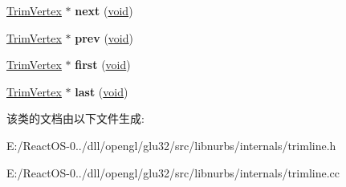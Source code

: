 \begin{DoxyCompactItemize}
\item 
\mbox{\label{class_trimline_aff8731faa5850ffe2c66caf4338dcaca}} 
\hyperlink{class_trim_vertex}{Trim\+Vertex} $\ast$ {\bfseries next} (\hyperlink{interfacevoid}{void})
\item 
\mbox{\label{class_trimline_a50047a61abee4420c1d0eb064f6fba00}} 
\hyperlink{class_trim_vertex}{Trim\+Vertex} $\ast$ {\bfseries prev} (\hyperlink{interfacevoid}{void})
\item 
\mbox{\label{class_trimline_a753a2682c0aa043b1bb42d935f38a0e2}} 
\hyperlink{class_trim_vertex}{Trim\+Vertex} $\ast$ {\bfseries first} (\hyperlink{interfacevoid}{void})
\item 
\mbox{\label{class_trimline_ae9650981ec39d336efcb040a61721481}} 
\hyperlink{class_trim_vertex}{Trim\+Vertex} $\ast$ {\bfseries last} (\hyperlink{interfacevoid}{void})
\end{DoxyCompactItemize}


该类的文档由以下文件生成\+:\begin{DoxyCompactItemize}
\item 
E\+:/\+React\+O\+S-\/0../dll/opengl/glu32/src/libnurbs/internals/trimline.\+h\item 
E\+:/\+React\+O\+S-\/0../dll/opengl/glu32/src/libnurbs/internals/trimline.\+cc\end{DoxyCompactItemize}
